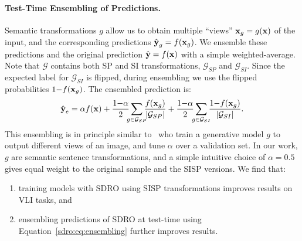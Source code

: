\paragraph{Test-Time Ensembling of Predictions.}
Semantic transformations $g$ allow us to obtain multiple ``views'' $\operatorname{\mathbf{x}}_g = g(\operatorname{\mathbf{x}})$ of the input, and the corresponding predictions $\hat{\operatorname{\mathbf{y}}}_g = f(\operatorname{\mathbf{x}}_g)$.
We ensemble these predictions and the original prediction $\hat{\operatorname{\mathbf{y}}}=f(\operatorname{\mathbf{x}})$ with a simple weighted-average.
Note that $\mathcal{G}$ contains both SP and SI transformations, $\mathcal{G}_{SP}$ and $\mathcal{G}_{SI}$. 
Since the expected label for $\mathcal{G}_{SI}$ is flipped, during ensembling we use the flipped probabilities $1{-}f(\operatorname{\mathbf{x}}_g)$.
The ensembled prediction is:
\begin{equation}
\hat{\y}_{e} = \alpha f(\x) +
\frac{1{-}\alpha}{2}\sum_{\mathclap{g\in\mathcal{G}_{SP}}}{\frac{f(\x_g)}{|\mathcal{G}_{SP}|}} + \frac{1{-}\alpha}{2}\sum_{\mathclap{g\in\mathcal{G}_{SI}}}\frac{1{-}f(\x_g)}{|\mathcal{G}_{SI}|}.
\label{sdro:eq:ensembling}
\end{equation}
This ensembling is in principle similar to~\citet{chai2021ensembling} who train a generative model $g$ to output different views of an image, and tune $\alpha$ over a validation set.
In our work, $g$ are semantic sentence transformations, and a simple intuitive choice of $\alpha{=}0.5$ gives equal weight to the original sample and the SISP versions.
We find that:
\begin{enumerate}[nosep,noitemsep,leftmargin=*]
\item training models with SDRO using SISP transformations improves results on VLI tasks, and
\item ensembling predictions of SDRO at test-time using Equation~\ref{sdro:eq:ensembling} further improves results.
\end{enumerate}